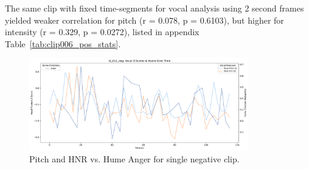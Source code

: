   The same clip with fixed time-segments for vocal analysis using 2 second frames yielded weaker correlation for pitch (r = 0.078, p = 0.6103), but higher for intensity (r = 0.329, p = 0.0272), listed in appendix Table~\ref{tab:clip006_pos_stats}. 


  

\begin{figure}[H]
    \centering
    \includegraphics[width=0.85\textwidth]{png/results/rq3_2/combined_zscore_hume_id_012_neg_6.pdf} 
    \caption{Pitch and HNR vs. Hume Anger for single negative clip.}
    \label{fig:012_neg-anger}
\end{figure}

